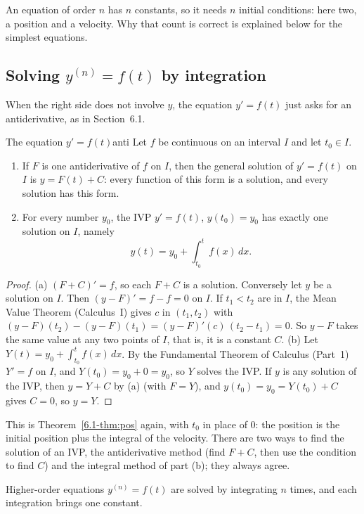 \documentclass[11pt]{article}
\begin{document}
An equation of order $n$ has $n$ constants, so it needs $n$ initial conditions: here two, a position and a velocity. Why that count is correct is explained below for the simplest equations.

\subsection*{Solving $y^{(n)}=f(t)$ by integration}

When the right side does not involve $y$, the equation $y'=f(t)$ just asks for an antiderivative, as in Section~6.1.

\begin{thm}{The equation $y'=f(t)$}{anti}
Let $f$ be continuous on an interval $I$ and let $t_0\in I$.
\begin{enumerate}[label=(\alph*),nosep]
  \item If $F$ is one antiderivative of $f$ on $I$, then the general solution of $y'=f(t)$ on $I$ is $y=F(t)+C$: every function of this form is a solution, and every solution has this form.
  \item For every number $y_0$, the IVP $y'=f(t)$, $y(t_0)=y_0$ has exactly one solution on $I$, namely
  \[
  y(t)=y_0+\int_{t_0}^tf(x)\,dx .
  \]
\end{enumerate}
\end{thm}
\begin{proof}
(a) $(F+C)'=f$, so each $F+C$ is a solution. Conversely let $y$ be a solution on $I$. Then $(y-F)'=f-f=0$ on $I$. If $t_1<t_2$ are in $I$, the Mean Value Theorem (Calculus~I) gives $c$ in $(t_1,t_2)$ with $(y-F)(t_2)-(y-F)(t_1)=(y-F)'(c)\,(t_2-t_1)=0$. So $y-F$ takes the same value at any two points of $I$, that is, it is a constant $C$.
(b) Let $Y(t)=y_0+\int_{t_0}^tf(x)\,dx$. By the Fundamental Theorem of Calculus (Part~1) $Y'=f$ on $I$, and $Y(t_0)=y_0+0=y_0$, so $Y$ solves the IVP. If $y$ is any solution of the IVP, then $y=Y+C$ by (a) (with $F=Y$), and $y(t_0)=y_0=Y(t_0)+C$ gives $C=0$, so $y=Y$.
\end{proof}

This is Theorem~\ref{6.1-thm:pos} again, with $t_0$ in place of $0$: the position is the initial position plus the integral of the velocity. There are two ways to find the solution of an IVP, the antiderivative method (find $F+C$, then use the condition to find $C$) and the integral method of part (b); they always agree.

Higher-order equations $y^{(n)}=f(t)$ are solved by integrating $n$ times, and each integration brings one constant.
\end{document}
